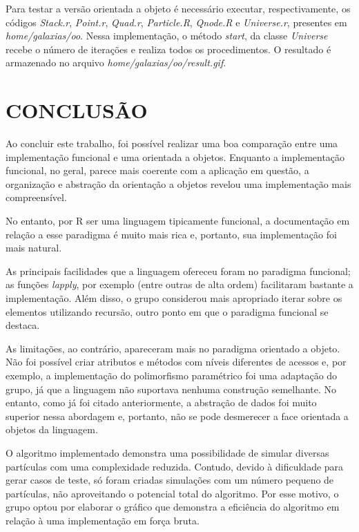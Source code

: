 \documentclass[rel_mlp]{iiufrgs}
\begin{document}
Para testar a versão orientada a objeto é necessário executar, respectivamente, os códigos
\textit{Stack.r}, \textit{Point.r}, \textit{Quad.r}, \textit{Particle.R}, \textit{Qnode.R} e
\textit{Universe.r}, presentes em \textit{home/galaxias/oo}. Nessa implementação, o método
\textit{start}, da classe \textit{Universe} recebe o número de iterações e realiza todos os procedimentos.
O resultado é armazenado no arquivo \textit{home/galaxias/oo/result.gif}.

%
\chapter{CONCLUSÃO}

Ao concluir este trabalho, foi possível realizar uma boa comparação entre uma implementação
funcional e uma orientada a objetos. Enquanto a implementação funcional, no geral, parece mais
coerente com a aplicação em questão, a organização e abstração da orientação a objetos revelou
uma implementação mais compreensível.

No entanto, por R ser uma linguagem tipicamente funcional, a documentação em relação a esse paradigma
é muito mais rica e, portanto, sua implementação foi mais natural.

As principais facilidades que a linguagem ofereceu foram no paradigma funcional; as funções
\textit{lapply}, por exemplo (entre outras de alta ordem) facilitaram bastante a implementação.
Além disso, o grupo considerou mais apropriado iterar sobre os elementos utilizando recursão, outro ponto
em que o paradigma funcional se destaca.

As limitações, ao contrário, apareceram mais no paradigma orientado a objeto. Não foi possível
criar atributos e métodos com níveis diferentes de acessos e, por exemplo, a implementação do polimorfismo
paramétrico foi uma adaptação do grupo, já que a linguagem não suportava nenhuma construção semelhante. No
entanto, como já foi citado anteriormente, a abstração de dados foi muito superior nessa abordagem e, portanto,
não se pode desmerecer a face orientada a objetos da linguagem.

O algoritmo implementado demonstra uma possibilidade de simular diversas partículas com
uma complexidade reduzida. Contudo, devido à dificuldade para gerar casos de teste,
só foram criadas simulações com um número pequeno de partículas, não aproveitando o
potencial total do algoritmo. Por esse motivo, o grupo optou por elaborar o
gráfico que demonstra a eficiência do algoritmo em relação à uma implementação em força bruta.
\end{document}
